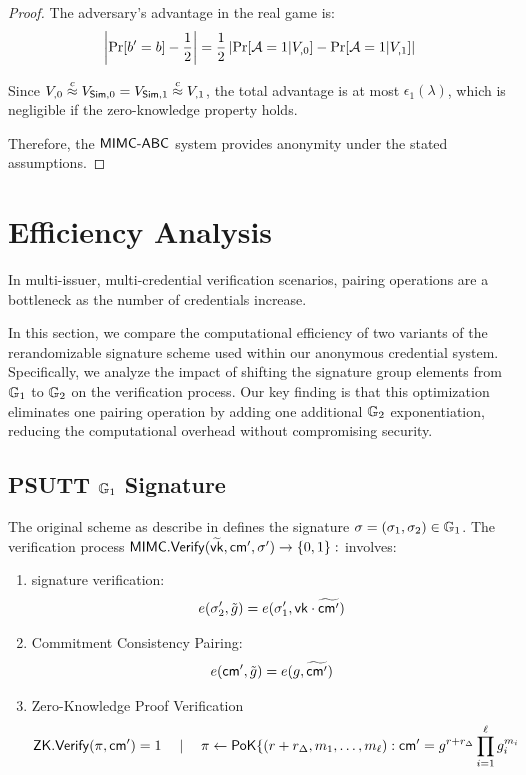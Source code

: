 \begin{proof}
    The adversary's advantage in the real game is:
    \[
    \left|\Pr[b' = b] - \frac{1}{2}\right| = \frac{1}{2} \left|\Pr[\Adv = 1 | V_{\real,0}] - \Pr[\Adv = 1 | V_{\real,1}]\right|
    \]
    
    Since $V_{\real,0} \stackrel{c}{\approx} V_{\Sim,0} = V_{\Sim,1} \stackrel{c}{\approx} V_{\real,1}$, the total advantage is at most $\epsilon_1(\lambda)$, which is negligible if the zero-knowledge property holds.
    
    Therefore, the $\mathsf{MIMC\text{-}ABC}$ system provides anonymity under the stated assumptions.
\end{proof}


\newpage


\section{Efficiency Analysis}

In multi-issuer, multi-credential verification scenarios, pairing operations are a bottleneck as the number of credentials increase. 

In this section, we compare the computational efficiency of two variants of the rerandomizable signature scheme used within our anonymous credential system. Specifically, we analyze the impact of shifting the signature group elements from $\mathbb{G}_1$ to $\mathbb{G}_2$ on the verification process. Our key finding is that this optimization eliminates one pairing operation by adding one additional $\mathbb{G}_2$ exponentiation, reducing the computational overhead without compromising security.

\subsection{PSUTT \cite{tomescu2022utt} $\mathbb{G}_1$ Signature}
The original scheme as describe in \cite{tomescu2022utt} defines the signature $\sigma = (\sigma_1, \sigma_2) \in \mathbb{G}_1$. The verification process $\mathsf{MIMC.Verify}(\widetilde{\mathsf{vk}}, \mathsf{cm}', {\sigma}') \to \{0,1\}:$  involves:
\begin{enumerate}
    \item signature verification:
    \[
    e(\sigma_2', \tilde{g}) = e(\sigma_1', \mathsf{vk} \cdot \widetilde{\mathsf{cm}'})
    \]
    \item Commitment Consistency Pairing: 
    \[
    e(\mathsf{cm}', \tilde{g}) = e(g, \widetilde{\mathsf{cm}'})
    \]
    \item Zero-Knowledge Proof Verification
    \[
    \mathsf{ZK.Verify}(\pi, \mathsf{cm}') = 1 \quad \mid \quad \pi \gets \mathsf{PoK}\{(r + r_\Delta, m_1,\ldots,m_\ell): \mathsf{cm}' = g^{r + r_\Delta} \prod_{i=1}^\ell g_i^{m_i}
    \]
\end{enumerate}

